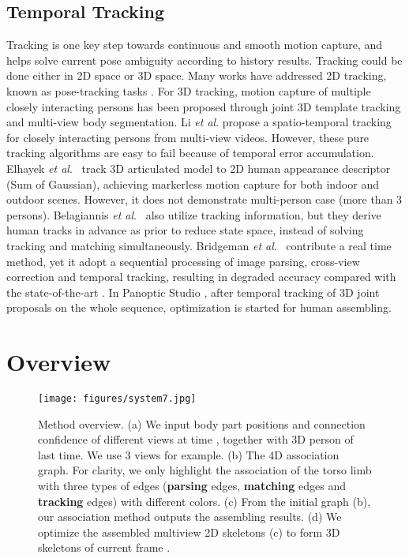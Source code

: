\documentclass[10pt,twocolumn,letterpaper]{article}
\begin{document}
\subsection{Temporal Tracking}
Tracking is one key step towards continuous and smooth motion capture, and helps solve current pose ambiguity according to history results. Tracking could be done either in 2D space or 3D space. Many works have addressed 2D tracking, known as pose-tracking tasks \cite{andriluka2018posetrack,CVPR2019_staf,iqbal2017posetrack,insafutdinov2017arttrack}. For 3D tracking, motion capture of multiple closely interacting persons \cite{liu2011markerless,liu2013markerless} has been proposed through joint 3D template tracking and multi-view body segmentation. Li \emph{et al}. \cite{li2018PG} propose a spatio-temporal tracking for closely interacting persons from multi-view videos. However, these pure tracking algorithms are easy to fail because of temporal error accumulation. Elhayek \emph{et al}.~\cite{elhayek2017marconi} track 3D articulated model to 2D human appearance descriptor (Sum of Gaussian), achieving markerless motion capture for both indoor and outdoor scenes. However, it does not demonstrate multi-person case (more than 3 persons). Belagiannis \emph{et al}.~\cite{belagiannis2014temporal3DPS} also utilize tracking information, but they derive human tracks in advance as prior to reduce state space, instead of solving tracking and matching simultaneously. Bridgeman \emph{et al}.~\cite{bridgeman2019multi} contribute a real time method, yet it adopt a sequential processing of image parsing, cross-view correction and temporal tracking, resulting in degraded accuracy compared with the state-of-the-art \cite{dong2019fast}. In Panoptic Studio \cite{joo2019panoptic}, after temporal tracking of 3D joint proposals on the whole sequence, optimization is started for human assembling.    \section{Overview}
\label{sec:formulation}
\begin{figure*}[ht!]
    \centering
    \texttt{[image: figures/system7.jpg]}
    \vspace{-3mm}    
    \caption{Method overview. (a) We input body part positions and connection confidence of different views at time , together with 3D person of last time. We use 3 views for example. (b) The 4D association graph. For clarity, we only highlight the association of the torso limb with three types of edges (\textbf{parsing} edges, \textbf{matching} edges and \textbf{tracking} edges) with different colors. (c) From the initial graph (b), our association method outputs the assembling results. (d) We optimize the assembled multiview 2D skeletons (c) to form 3D skeletons of current frame .
    }
    \label{fig:overview_system}
    \vspace{-3mm}
\end{figure*}
\end{document}
